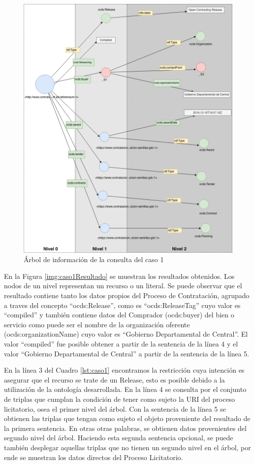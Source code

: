  \begin{figure}[ht!]
    \centering
    \includegraphics[width=150mm]{figuras/Diagramas-Caso1.png}
    \caption{Árbol de información de la consulta del caso 1}
    \label{img:caso1Diagrama}
 \end{figure}

En la Figura \ref{img:caso1Resultado} se muestran los resultados obtenidos. Los nodos de un nivel representan un recurso o un literal. Se puede observar que el resultado contiene tanto los datos propios del Proceso de Contratación, agrupado a traves del concepto “ocds:Release”, como es “ocds:ReleaseTag” cuyo valor es “compiled” y también contiene datos del Comprador (ocds:buyer) del bien o servicio como puede ser el nombre de la organización oferente (ocds:organizationName) cuyo valor es “Gobierno Departamental de Central”. El valor “compiled” fue posible obtener a partir de la sentencia de la línea 4 y el valor “Gobierno Departamental de Central” a partir de la sentencia de la línea 5.

En la línea 3 del Cuadro \ref{lst:caso1} encontramos la restricción cuya intención es asegurar que el recurso se trate de un Release, esto es posible debido a la utilización de la ontología desarrollada. En la línea 4 se consulta por el conjunto de triplas que cumplan la condición de tener como sujeto la URI del proceso licitatorio, osea el primer nivel del árbol. Con la sentencia de la línea 5 se obtienen las triplas que tengan como sujeto el objeto proveniente del resultado de la primera sentencia. En otras otras palabras, se obtienen datos provenientes del segundo nivel del árbol. Haciendo esta segunda sentencia opcional, se puede también desplegar aquellas triplas que no tienen un segundo nivel en el árbol, por ende se muestran los datos directos del Proceso Licitatorio.

